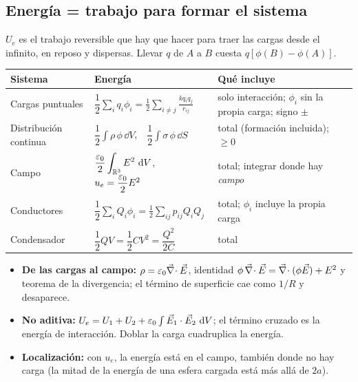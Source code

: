 \subsection{Energía = trabajo para formar el sistema}

$U_e$ es el trabajo reversible que hay que hacer para traer las cargas desde el infinito, en reposo y dispersas. Llevar $q$ de $A$ a $B$
cuesta $q[\phi(B)-\phi(A)]$.

\begin{center}
\small
\renewcommand{\arraystretch}{1.75}
\begin{tabularx}{\textwidth}{@{}>{\raggedright\arraybackslash}p{3.6cm}>{\raggedright\arraybackslash}p{4.7cm}>{\raggedright\arraybackslash}X@{}}
\toprule
Sistema & Energía & Qué incluye\\
\midrule
Cargas puntuales & $\dfrac12\displaystyle\sum_iq_i\phi_i=\frac12\sum_{i\neq j}\frac{kq_iq_j}{r_{ij}}$ & solo interacción; $\phi_i$ sin la propia carga; signo $\pm$\\
Distribución continua & $\dfrac12\displaystyle\int\rho\,\phi\,\dd V$,\ \ $\dfrac12\displaystyle\int\sigma\,\phi\,\dd S$ & total (formación incluida); $\geq0$\\
Campo & $\dfrac{\varepsilon_0}{2}\displaystyle\int_{\mathbb R^3}E^2\,\mathop{}\!\mathrm{d} V$,\ \ $u_e=\dfrac{\varepsilon_0}{2}E^2$ & total; integrar donde hay \emph{campo}\\
Conductores & $\dfrac12\displaystyle\sum_iQ_i\phi_i=\frac12\sum_{ij}p_{ij}Q_iQ_j$ & total; $\phi_i$ incluye la propia carga\\
Condensador & $\dfrac12QV=\dfrac12CV^2=\dfrac{Q^2}{2C}$ & total\\
\bottomrule
\end{tabularx}
\end{center}

\begin{itemize}
  \item \textbf{De las cargas al campo:} $\rho=\varepsilon_0\vec\nabla\!\cdot\vec E$, identidad $\phi\,\vec\nabla\!\cdot\vec E=\vec\nabla\!\cdot(\phi\vec E)+E^2$ y teorema de la divergencia; el término de superficie
        cae como $1/R$ y desaparece.
  \item \textbf{No aditiva:} $U_e=U_1+U_2+\varepsilon_0\int\vec E_1\cdot\vec E_2\,\mathop{}\!\mathrm{d} V$; el término cruzado es la energía de interacción. Doblar la carga cuadruplica la energía.
  \item \textbf{Localización:} con $u_e$, la energía está en el campo, también donde no hay carga (la mitad de la energía de una esfera cargada está más allá de $2a$).
\end{itemize}

